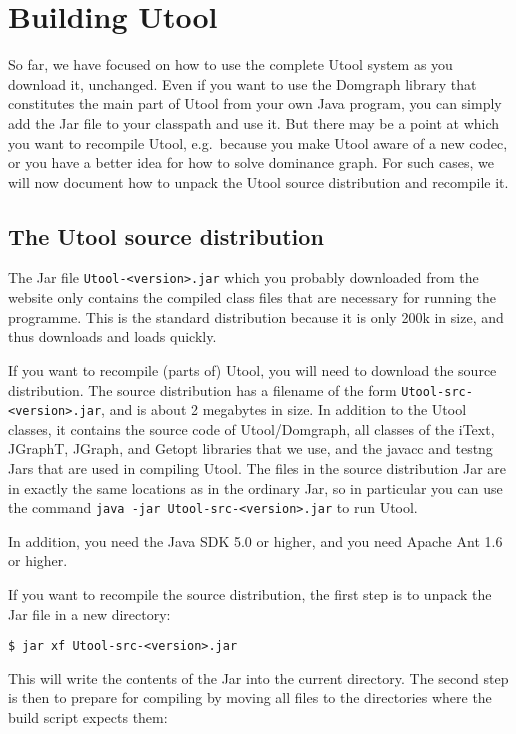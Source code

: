 \section{Building Utool} \label{sec:building}

So far, we have focused on how to use the complete Utool system as you
download it, unchanged. Even if you want to use the Domgraph library
that constitutes the main part of Utool from your own Java program,
you can simply add the Jar file to your classpath and use it. But
there may be a point at which you want to recompile Utool, e.g.\
because you make Utool aware of a new codec, or you have a better idea
for how to solve dominance graph. For such cases, we will now document
how to unpack the Utool source distribution and recompile it.



\subsection{The Utool source distribution}

The Jar file \verb?Utool-<version>.jar? which you probably downloaded
from the website only contains the compiled class files that are
necessary for running the programme. This is the standard distribution
because it is only 200k in size, and thus downloads and loads quickly.

If you want to recompile (parts of) Utool, you will need to download
the source distribution. The source distribution has a filename of the
form \verb?Utool-src-<version>.jar?, and is about 2 megabytes in
size. In addition to the Utool classes, it contains the source code of
Utool/Domgraph, all classes of the iText, JGraphT, JGraph, and Getopt
libraries that we use, and the javacc and testng Jars that are used in
compiling Utool. The files in the source distribution Jar are in
exactly the same locations as in the ordinary Jar, so in particular
you can use the command \verb?java -jar Utool-src-<version>.jar? to
run Utool.

In addition, you need the Java SDK 5.0 or higher, and you need Apache
Ant 1.6 or higher.

If you want to recompile the source distribution, the first step is to
unpack the Jar file in a new directory:

\begin{verbatim}
$ jar xf Utool-src-<version>.jar
\end{verbatim}

This will write the contents of the Jar into the current
directory. The second step is then to prepare for compiling by moving
all files to the directories where the build script expects them:

